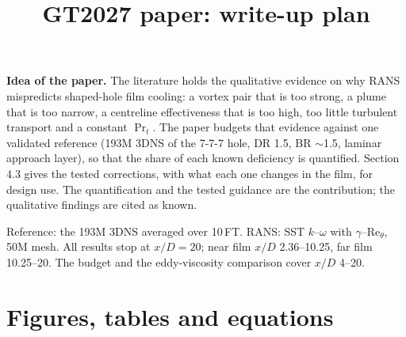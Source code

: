 \documentclass[10pt]{article}
\title{GT2027 paper: write-up plan}
\author{}
\date{}
\begin{document}
\maketitle
\vspace{-14mm}

\textbf{Idea of the paper.} The literature holds the qualitative evidence on why RANS mispredicts shaped-hole film
cooling: a vortex pair that is too strong, a plume that is too narrow, a centreline effectiveness that is too
high, too little turbulent transport and a constant $\Pr_t$. The paper budgets that evidence against one
validated reference (193M 3DNS of the 7-7-7 hole, DR 1.5, BR $\sim$1.5, laminar approach layer), so that the
share of each known deficiency is quantified. Section 4.3 gives the tested corrections, with what each one
changes in the film, for design use. The quantification and the tested guidance are the contribution; the
qualitative findings are cited as known.

Reference: the 193M 3DNS averaged over 10\,FT. RANS: SST $k$--$\omega$ with $\gamma$--$\mathrm{Re}_\theta$,
50M mesh. All results stop at $x/D=20$; near film $x/D$ 2.36--10.25, far film 10.25--20. The budget and the
eddy-viscosity comparison cover $x/D$ 4--20.

\section*{Figures, tables and equations}
\end{document}
